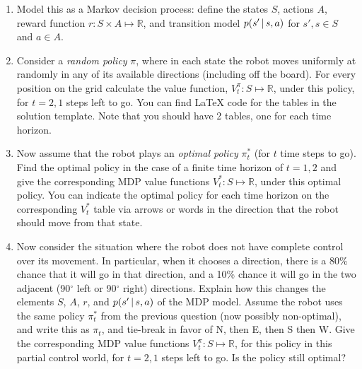 \documentclass[submit]{harvardml}
\begin{document}
\begin{problem}
  \begin{enumerate}
    \item Model this as a Markov decision process: define the states $S$, actions $A$, reward function $r:S\times A\mapsto \mathbb{R}$, and transition model $p(s'\,|\, s, a)$ for $s', s\in S$ and $a\in A$.
%
    \item Consider a \emph{random policy} $\pi$, where
in each state the robot moves uniformly at randomly in any of its available directions (including off the board). 
      For every position on the grid calculate the
value function, $V^\pi_t: S\mapsto 
\mathbb{R}$, under this policy, for $t=2, 1$ steps left
to go. You can find LaTeX code for the tables in the solution template. Note that you should have 2 tables, one for each time horizon. 
%
    \item Now assume that the robot plays an \emph{optimal policy}
      $\pi^\ast_t$ (for $t$ time steps to go). Find the optimal policy in the case of a finite time horizon of $t = 1, 2$ and give the corresponding 
MDP value functions $V^\ast_t: S\mapsto 
\mathbb{R}$, under this
optimal policy. You can indicate the optimal policy for each time horizon on the corresponding $V^\ast_t$ table via arrows or words in the direction that the robot should move from that state. 
    \item Now consider the situation where the robot does not have
      complete control over its movement. In particular, 
when it chooses a direction, there is a 80\% chance that it will go in
      that direction, and a 10\% chance it will go in the two adjacent
      (90$^\circ$ left or 90$^\circ$ right) 
directions. Explain how this changes the elements $S$, $A$, $r$, and $p(s' \,|\, s,a)$ of the MDP model. 
Assume the robot uses the same
 policy $\pi^\ast_t$ from the previous question (now possibly
      non-optimal), and write this as $\pi_t$, and tie-break in favor of N, then E, then S then W.
Give the corresponding 
MDP value functions $V^\pi_t: S\mapsto 
\mathbb{R}$, for this policy in this partial control world, for $t=2, 1$ steps left
to go. Is the policy still optimal?
  \end{enumerate}
\end{problem}

\end{document}
